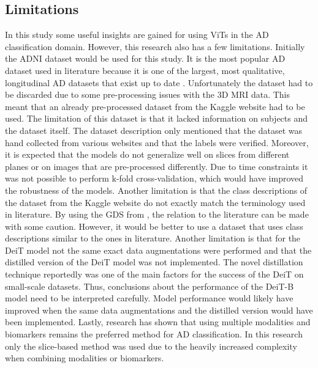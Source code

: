 \documentclass[11pt, a4paper]{article}
\begin{document}
\subsection{Limitations} \label{subs:limit}
In this study some useful insights are gained for using ViTs in the AD classification domain. However, this research also has a few limitations. Initially the ADNI dataset would be used for this study. It is the most popular AD dataset used in literature because it is one of the largest, most qualitative, longitudinal AD datasets that exist up to date \citep{Ebrahimighahnavieh2020DeepReview}. Unfortunately the dataset had to be discarded due to some pre-processing issues with the 3D MRI data. This meant that an already pre-processed dataset from the Kaggle website had to be used. The limitation of this dataset is that it lacked information on subjects and the dataset itself. The dataset description only mentioned that the dataset was hand collected from various websites and that the labels were verified. Moreover, it is expected that the models do not generalize well on slices from different planes or on images that are pre-processed differently. Due to time constraints it was not possible to perform k-fold cross-validation, which would have improved the robustness of the models. Another limitation is that the class descriptions of the dataset from the Kaggle website do not exactly match the terminology used in literature. By using the GDS from \cite{Reisberg1982TheDementia}, the relation to the literature can be made with some caution. However, it would be better to use a dataset that uses class descriptions similar to the ones in literature. Another limitation is that for the DeiT model not the same exact data augmentations were performed and that the distilled version of the DeiT model was not implemented. The novel distillation technique reportedly was one of the main factors for the success of the DeiT on small-scale datasets. Thus, conclusions about the performance of the DeiT-B model need to be interpreted carefully. Model performance would likely have improved when the same data augmentations and the distilled version would have been implemented. Lastly, research has shown that using multiple modalities and biomarkers remains the preferred method for AD classification. In this research only the slice-based method was used due to the heavily increased complexity when combining modalities or biomarkers.
\end{document}
